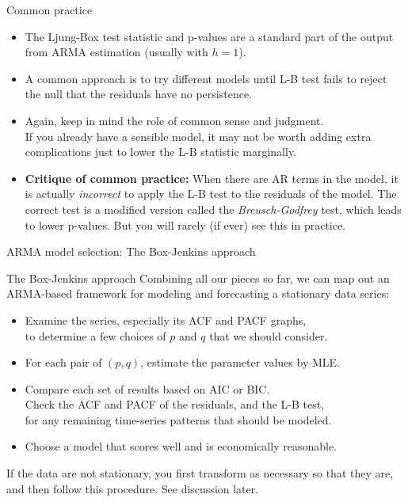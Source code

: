 \documentclass[t,12pt]{beamer}
\begin{document}
\begin{frame}[c]{Common practice}
\begin{itemize}
\item The Ljung-Box test statistic and p-values are a standard part of the output from ARMA estimation (usually with $h=1$).
\medskip
\item A common approach is to try different models until L-B test fails to reject the null that the residuals have no persistence.
\medskip
\item Again, keep in mind the role of common sense and judgment. 
\\
If you already have a sensible model, 
it may not be worth adding extra complications just to lower the L-B statistic marginally.
\end{itemize}
\medskip
\begin{itemize}
\item 
{\footnotesize
\textbf{Critique of common practice:}
When there are AR terms in the model, it is actually \emph{incorrect} to apply the L-B test to the residuals of the model.
The correct test is a modified version called the \emph{Breusch-Godfrey} test, which leads to lower p-values.
But you will rarely (if ever) see this in practice.
}
\end{itemize}
\end{frame}

\begin{frame}[c]
\vfill
\centerline{ARMA model selection: The Box-Jenkins approach}
\vfill
\end{frame}

\begin{frame}[c]{The Box-Jenkins approach}
Combining all our pieces so far, we can map out an ARMA-based framework for modeling and forecasting a stationary data series:
\begin{itemize}
\smallskip
\item Examine the series, especially its ACF and PACF graphs, 
\\ to determine a few choices of $p$ and $q$ that we should consider.
\item For each pair of $(p,q)$, estimate the parameter values by MLE. 
\item Compare each set of results based on AIC or BIC. 
\\ Check the ACF and PACF of the residuals, and the L-B test, 
\\ for any remaining time-series patterns that should be modeled.
\item Choose a model that scores well and is economically reasonable.
\end{itemize}
\smallskip
If the data are not stationary, you first transform as necessary so that they are, and then follow this procedure. See discussion later.
\end{frame}
\end{document}
